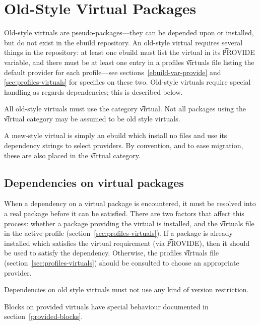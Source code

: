 \chapter{Old-Style Virtual Packages}
\label{sec:old-virtuals}

Old-style virtuals are pseudo-packages---they can be depended upon or
installed, but do not exist in the ebuild repository.  An old-style
virtual requires several things in the repository: at least one ebuild
must list the virtual in its \t{PROVIDE} variable, and there must be
at least one entry in a profiles \t{virtuals} file listing the default
provider for each profile---see sections~\ref{ebuild-var-provide} and
\ref{sec:profiles-virtuals} for specifics on these two. Old-style virtuals
require special handling as regards dependencies; this is described
below.

All old-style virtuals must use the category \t{virtual}. Not all packages using the \t{virtual}
category may be assumed to be old style virtuals.

\note A \i{new-style} virtual is simply an ebuild which install no files and use its dependency
strings to select providers. By convention, and to ease migration, these are also placed in the
\t{virtual} category.

\section{Dependencies on virtual packages}

When a dependency on a virtual package is encountered, it must be
resolved into a real package before it can be satisfied. There are two
factors that affect this process: whether a package providing the
virtual is installed, and the \t{virtuals} file in the active profile
(section~\ref{sec:profiles-virtuals}). If a package is already installed
which satisfies the virtual requirement (via \t{PROVIDE}), then it
should be used to satisfy the dependency. Otherwise, the profiles
\t{virtuals} file (section~\ref{sec:profiles-virtuals}) should be
consulted to choose an appropriate provider.

Dependencies on old style virtuals must not use any kind of version restriction.

Blocks on provided virtuals have special behaviour documented in section~\ref{provided-blocks}.


